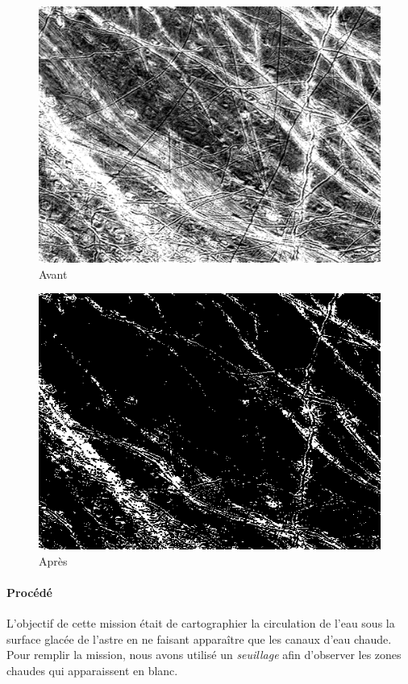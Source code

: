 	\begin{figure}[h]
	\centering
		\begin{multicols}{2}
		\includegraphics[scale=0.5]{images/Europa_surface.png}
		Avant

		\includegraphics[scale=0.5]{images/MissionA3.png}
		Après
		\end{multicols}
	\end{figure}
	\vspace{-0.9cm}

	\paragraph{Procédé}	
		L'objectif de cette mission était de cartographier la circulation de l'eau sous la surface glacée de l'astre en ne faisant apparaître que les canaux d'eau chaude. Pour remplir la mission, nous avons utilisé un \emph{seuillage} afin d'observer les zones chaudes qui apparaissent en blanc.